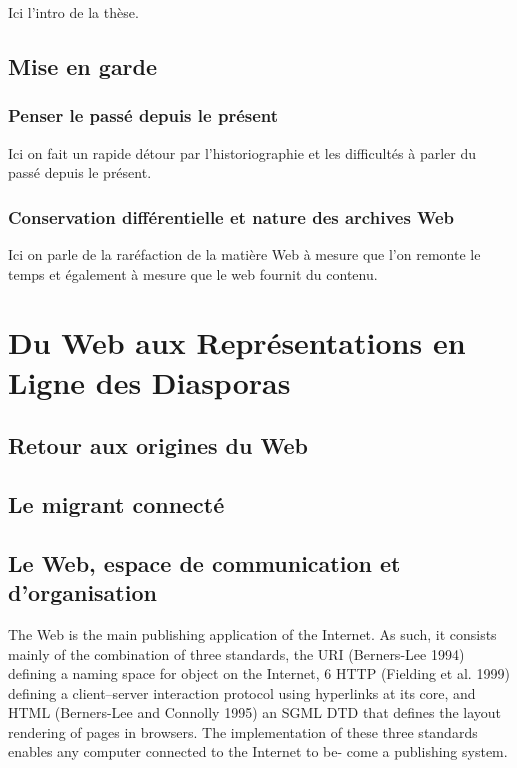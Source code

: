 \documentclass[symmetric,justified,marginals=raggedouter]{tufte-book}
\begin{document}
Ici l'intro de la thèse.

\section{Mise en garde}

\subsection{Penser le passé depuis le présent}

Ici on fait un rapide détour par l'historiographie et les difficultés à parler du passé depuis le présent.

\subsection{Conservation différentielle et nature des archives Web}

Ici on parle de la raréfaction de la matière Web à mesure que l'on remonte le temps et également à mesure que le web fournit du contenu.


\chapter{Du Web aux Représentations en Ligne des Diasporas}
\label{chap:2}

\section{Retour aux origines du Web}

\section{Le migrant connecté}

\section{Le Web, espace de communication et d'organisation}

The Web is the main publishing application of the Internet.
As such, it consists mainly of the combination of three standards, the URI (Berners-Lee 1994) defining a naming space for object on the Internet, 6 HTTP (Fielding et al. 1999) defining a client–server interaction protocol using hyperlinks at its core, and HTML (Berners-Lee and Connolly 1995) an SGML DTD that defines the layout rendering of pages in browsers.
The implementation of these three standards enables any computer connected to the Internet to be- come a publishing system.
\end{document}
